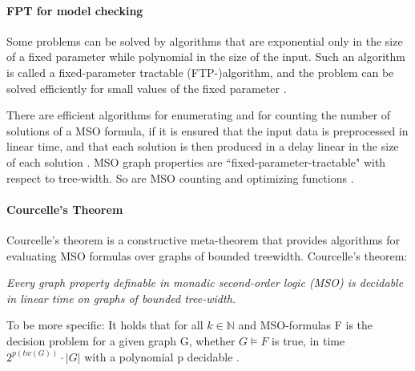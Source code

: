 \documentclass[a4paper, 12pt, bibliography=totoc]{scrartcl}
\begin{document}
\paragraph{FPT for model checking}
Some problems can be solved by algorithms that are exponential only in the size of a fixed parameter while polynomial in the size of the input. Such an algorithm is called a fixed-parameter tractable (FTP-)algorithm, and the problem can be solved efficiently for small values of the fixed parameter \cite{ParamCompGrohe}.

There are efficient algorithms for enumerating and for counting the number of solutions of a MSO formula, if it is ensured that the input data is preprocessed in linear time, and that each solution is then produced in a delay linear in the size of each solution \cite{MSOQueriesGuillaume, ARNBORG1991308}.
MSO graph properties are ``fixed-parameter-tractable" with respect to tree-width. So are MSO counting and optimizing functions \cite{CourcelleGROW}.


\paragraph{Courcelle's Theorem}
 Courcelle's theorem is a constructive meta-theorem that provides algorithms for evaluating MSO formulas over graphs of bounded treewidth.
Courcelle's theorem:

\smallskip\noindent
\textit{
	Every graph property definable in monadic second-order logic (MSO) is decidable in linear time on graphs of bounded tree-width. }\leftskip=1.5cm\rightskip=2cm

\leftskip=0cm\rightskip=0cm\smallskip

\noindent
To be more specific: It holds that for all $k \in \mathbb{N}$ and MSO-formulas F is the decision problem for a given graph G, whether $G \models F$ is true, in time $2^{p(tw(G))} \cdot |G|$ with a polynomial p decidable \cite[p. 54--56]{Courcelle2012}.\smallskip 
\end{document}
